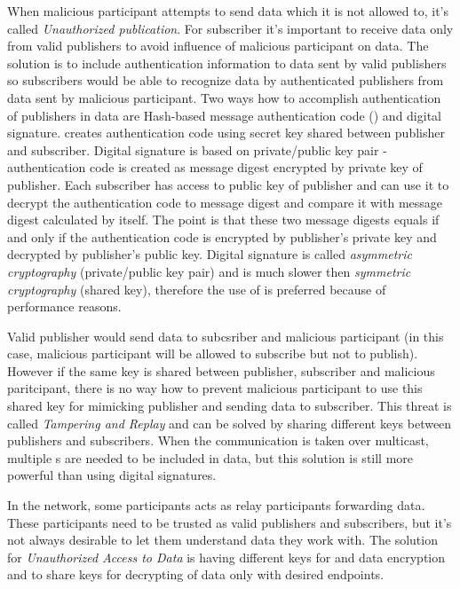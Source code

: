 When malicious participant attempts to send data which it is not allowed to, it's called {\em Unauthorized publication}. For subscriber it's important to receive data only from valid publishers to avoid influence of malicious participant on data. The solution is to include authentication information to data sent by valid publishers so subscribers would be able to recognize data by authenticated publishers from data sent by malicious participant. Two ways how to accomplish authentication of publishers in data are Hash-based message authentication code () and digital signature.  creates authentication code using secret key shared between publisher and subscriber. Digital signature is based on private/public key pair - authentication code is created as message digest encrypted by private key of publisher. Each subscriber has access to public key of publisher and can use it to decrypt the authentication code to message digest and compare it with message digest calculated by itself. The point is that these two message digests equals if and only if the authentication code is encrypted by publisher's private key and decrypted by publisher's public key. Digital signature is called {\em asymmetric cryptography} (private/public key pair) and is much slower then {\em symmetric cryptography} (shared key), therefore the use of  is preferred because of performance reasons.

Valid publisher would send data to subcsriber and malicious participant (in this case, malicious participant will be allowed to subscribe but not to publish). However if the same key is shared between publisher, subscriber and malicious paritcipant, there is no way how to prevent malicious participant to use this shared key for mimicking publisher and sending data to subscriber. This threat is called {\em Tampering and Replay} and can be solved by sharing different keys between publishers and subscribers. When the communication is taken over multicast, multiple s are needed to be included in data, but this solution is still more powerful than using digital signatures.

In the  network, some participants acts as relay participants forwarding data. These participants need to be trusted as valid publishers and subscribers, but it's not always desirable to let them understand data they work with. The solution for {\em Unauthorized Access to Data} is having different keys for  and data encryption and to share keys for decrypting of data only with desired endpoints.

